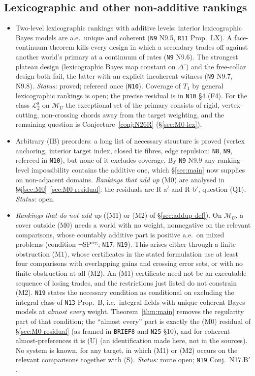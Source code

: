 \documentclass[11pt]{article}
\theoremstyle{definition}
\theoremstyle{remark}
\newcommand{\Di}{\Delta^{\circ}}
\newcommand{\M}{\mathcal M}
\newcommand{\src}[1]{\texttt{#1}}
\newcommand{\Ltwo}{\mathcal L_2^{\mathrm s}}
\begin{document}
\subsection{Lexicographic and other non-additive rankings}
\begin{itemize}[leftmargin=*]
\item Two-level lexicographic rankings with additive levels: interior lexicographic Bayes models are a.e.\ unique and coherent (\src{N9} N9.5, \src{R11} Prop.~LX). A face-continuum theorem kills every design in which a secondary trades off against another world's primary at a continuum of rates (\src{N9} N9.6). The strongest plateau design (lexicographic Bayes map constant on $\Di$) and the free-collar design both fail, the latter with an explicit incoherent witness (\src{N9} N9.7, N9.8). \emph{Status:} proved; refereed once (\src{N10}). Coverage of $T_1$ by general lexicographic rankings is open; the precise residual is in \src{N10} \S4 (F4). For the class $\Ltwo$ on $\M_U$ the exceptional set of the primary consists of rigid, vertex-cutting, non-crossing chords away from the target weighting, and the remaining question is Conjecture~\ref{conj:N26R} (\S\ref{sec:M0-lex}).
\item Arbitrary (IB) preorders: a long list of necessary structure is proved (vertex anchoring, interior target index, closed tie fibres, edge repulsion; \src{N8}, \src{N9}, refereed in \src{N10}), but none of it excludes coverage. By \src{N9} N9.9 any ranking-level impossibility contains the additive one, which \S\ref{sec:main} now supplies on non-adjacent domains. \emph{Rankings that add up} (M0) are analysed in \S\S\ref{sec:M0}--\ref{sec:M0-residual}: the residuals are R-a$'$ and R-b$'$, question (Q1). \emph{Status:} open.
\item \emph{Rankings that do not add up} ((M1) or (M2) of \S\ref{sec:addup-def}). On $\M_U$, a cover outside (M0) needs a world with no weight, nonnegative on the relevant comparisons, whose countably additive part is positive a.e.\ on mixed problems (condition $\neg$SP$^{\mathrm{reg}}$; \src{N17}, \src{N19}). This arises either through a finite obstruction (M1), whose certificates in the stated formulation use at least four comparisons with overlapping gains and crossing error sets, or with no finite obstruction at all (M2). An (M1) certificate need not be an executable sequence of losing trades, and the restrictions just listed do not constrain (M2). \src{N19} states the necessary condition as conditional on excluding the integral class of \src{N13} Prop.~B, i.e.\ integral fields with unique coherent Bayes models at \emph{almost every} weight. Theorem~\ref{thm:main} removes the regularity part of that condition; the ``almost every'' part is exactly the (M0) residual of \S\ref{sec:M0-residual} (as framed in \src{BRIEF8} and \src{N25} \S10), and for coherent almost-preferences it is (U) (an identification made here, not in the sources). No system is known, for any target, in which (M1) or (M2) occurs on the relevant comparisons together with (S). \emph{Status:} route open; \src{N19} Conj.~N17.B$'$.
\end{itemize}
\end{document}
